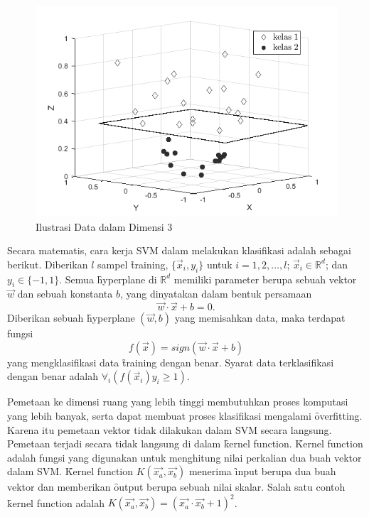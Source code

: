   \begin{figure}
    \centering
    \includegraphics[width=\linewidth]{pics/svm_3db_mono}
    \caption{Ilustrasi Data dalam Dimensi 3}
    \label{fig:svm3d}
  \end{figure}

  Secara matematis, cara kerja SVM dalam melakukan klasifikasi adalah sebagai berikut. Diberikan $l$ sampel \f{training}, $\{\vec x_i,y_i\}$ untuk $i=1,2,\dots,l$; $\vec x_i\in\mathbb{R}^d$; dan $y_i\in\{-1,1\}$. Semua \f{hyperplane} di $\mathbb{R}^d$ memiliki parameter berupa sebuah vektor $\vec w$ dan sebuah konstanta $b$, yang dinyatakan dalam bentuk persamaan
  \begin{equation}
    \vec w\cdot\vec x+b=0.
  \end{equation}
  Diberikan sebuah \f{hyperplane} $(\vec w,b)$ yang memisahkan data, maka terdapat fungsi
  \begin{equation}
    f(\vec x) = sign(\vec w\cdot\vec x+b)
  \end{equation}
  yang mengklasifikasi data \f{training} dengan benar. Syarat data terklasifikasi dengan benar adalah $\forall_i(f(\vec x_i)y_i \geq 1)$.

  Pemetaan ke dimensi ruang yang lebih tinggi membutuhkan proses komputasi yang lebih banyak, serta dapat membuat proses klasifikasi mengalami \f{overfitting}. Karena itu pemetaan vektor tidak dilakukan dalam SVM secara langsung. Pemetaan terjadi secara tidak langsung di dalam \f{kernel function}. \f{Kernel function} adalah fungsi yang digunakan untuk menghitung nilai perkalian dua buah vektor dalam SVM. \f{Kernel function} $K(\vec{x_a},\vec{x_b})$ menerima \f{input} berupa dua buah vektor dan memberikan \f{output} berupa sebuah nilai skalar. Salah satu contoh \f{kernel function} adalah $K(\vec{x_a},\vec{x_b}) = (\vec{x_a}\cdot\vec{x_b}+1)^2$.



